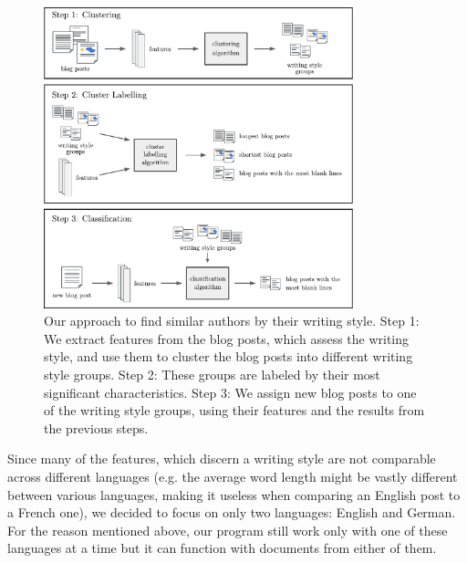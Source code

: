 \begin{figure}[h]
    \centering
    \includegraphics[width=0.8\textwidth]{images/Figure_1.pdf}
    \caption{Our approach to find similar authors by their writing style. Step 1: We extract features from the blog posts, which assess the writing style, and use them to cluster the blog posts into different writing style groups. Step 2: These groups are labeled by their most significant characteristics. Step 3: We assign new blog posts to one of the writing style groups, using their features and the results from the previous steps.}
    \label{fig:figure_1}
\end{figure}

Since many of the features, which discern a writing style are not comparable across different languages (e.g. the average word length might be vastly different between various languages, making it useless when comparing an English post to a French one), we decided to focus on only two languages: English and German.
For the reason mentioned above, our program still work only with one of these languages at a time but it can function with documents from either of them.